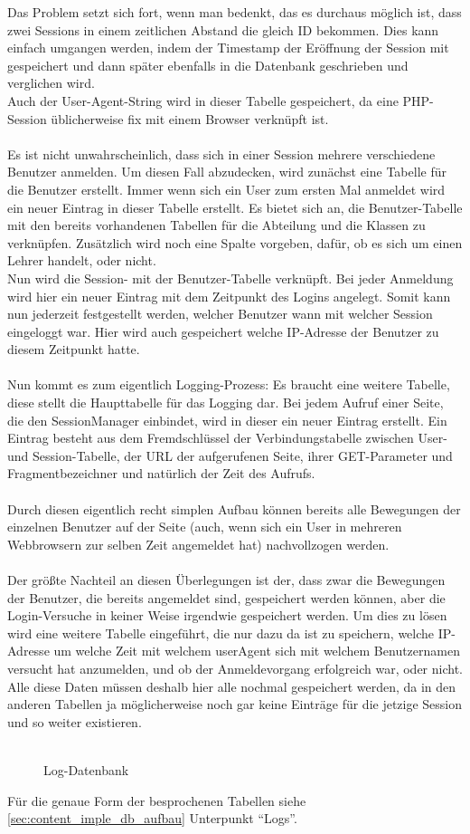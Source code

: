 Das Problem setzt sich fort, wenn man bedenkt, das es durchaus möglich ist, dass zwei Sessions in einem zeitlichen Abstand die gleich ID bekommen. Dies kann einfach umgangen werden, indem der Timestamp der Eröffnung der Session mit gespeichert und dann später ebenfalls in die Datenbank geschrieben und verglichen wird.\\
Auch der User-Agent-String wird in dieser Tabelle gespeichert, da eine PHP-Session üblicherweise fix mit einem Browser verknüpft ist.\\
\\
Es ist nicht unwahrscheinlich, dass sich in einer Session mehrere verschiedene Benutzer anmelden. Um diesen Fall abzudecken, wird zunächst eine Tabelle für die Benutzer erstellt. Immer wenn sich ein User zum ersten Mal anmeldet wird ein neuer Eintrag in dieser Tabelle erstellt. Es bietet sich an, die Benutzer-Tabelle mit den bereits vorhandenen Tabellen für die Abteilung und die Klassen zu verknüpfen. Zusätzlich wird noch eine Spalte vorgeben, dafür, ob es sich um einen Lehrer handelt, oder nicht.\\
Nun wird die Session- mit der Benutzer-Tabelle verknüpft. Bei jeder Anmeldung wird hier ein neuer Eintrag mit dem Zeitpunkt des Logins angelegt. Somit kann nun jederzeit festgestellt werden, welcher Benutzer wann mit welcher Session eingeloggt war. Hier wird auch gespeichert welche IP-Adresse der Benutzer zu diesem Zeitpunkt hatte.\\
\\
Nun kommt es zum eigentlich Logging-Prozess: Es braucht eine weitere Tabelle, diese stellt die Haupttabelle für das Logging dar. Bei jedem Aufruf einer Seite, die den SessionManager einbindet, wird in dieser ein neuer Eintrag erstellt. Ein Eintrag besteht aus dem Fremdschlüssel der Verbindungstabelle zwischen User- und Session-Tabelle, der URL der aufgerufenen Seite, ihrer GET-Parameter und Fragmentbezeichner und natürlich der Zeit des Aufrufs.\\
\\
Durch diesen eigentlich recht simplen Aufbau können bereits alle Bewegungen der einzelnen Benutzer auf der Seite (auch, wenn sich ein User in mehreren Webbrowsern zur selben Zeit angemeldet hat) nachvollzogen werden.\\
\\
Der größte Nachteil an diesen Überlegungen ist der, dass zwar die Bewegungen der Benutzer, die bereits angemeldet sind, gespeichert werden können, aber die Login-Versuche in keiner Weise irgendwie gespeichert werden. Um dies zu lösen wird eine weitere Tabelle eingeführt, die nur dazu da ist zu speichern, welche IP-Adresse um welche Zeit mit welchem userAgent sich mit welchem Benutzernamen versucht hat anzumelden, und ob der Anmeldevorgang erfolgreich war, oder nicht. Alle diese Daten müssen deshalb hier alle nochmal gespeichert werden, da in den anderen Tabellen ja möglicherweise noch gar keine Einträge für die jetzige Session und so weiter existieren.\\
\\
\begin{figure}[H]
\centering
{}
\caption{Log-Datenbank}
\end{figure}
Für die genaue Form der besprochenen Tabellen siehe \autoref{sec:content_imple_db_aufbau} Unterpunkt \enquote{Logs}.
 

